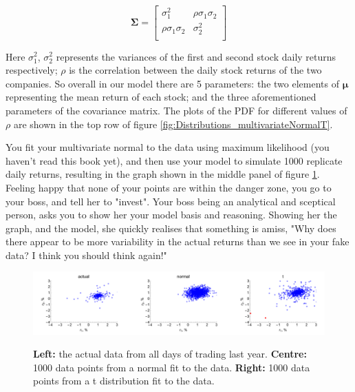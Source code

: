 \documentclass[11pt,fullpage]{book}
\begin{document}
\begin{equation}
\boldsymbol{\Sigma} = 
\begin{bmatrix}
\sigma_1^2 & \rho\sigma_1\sigma_2\\
\rho\sigma_1\sigma_2 & \sigma_2^2\\
\end{bmatrix}
\end{equation}

Here $\sigma_1^2$, $\sigma_2^2$ represents the variances of the first and second stock daily returns respectively; $\rho$ is the correlation between the daily stock returns of the two companies. So overall in our model there are 5 parameters: the two elements of $\boldsymbol{\mu}$ representing the mean return of each stock; and the three aforementioned parameters of the covariance matrix. The plots of the PDF for different values of $\rho$ are shown in the top row of figure \ref{fig:Distributions_multivariateNormalT}.

You fit your multivariate normal to the data using maximum likelihood (you haven't read this book yet), and then use your model to simulate 1000 replicate daily returns, resulting in the graph shown in the middle panel of figure \ref{fig:Distributions_multivariateNormalTEstimates}. Feeling happy that none of your points are within the danger zone, you go to your boss, and tell her to "invest". Your boss being an analytical and sceptical person, asks you to show her your model basis and reasoning. Showing her the graph, and the model, she quickly realises that something is amiss, "Why does there appear to be more variability in the actual returns than we see in your fake data? I think you should think again!"

\begin{figure}
\centering
\scalebox{0.3} 
{\includegraphics{Distributions_multivariateNormalTEstimates.pdf}}
\caption{\textbf{Left:} the actual data from all days of trading last year. \textbf{Centre:} 1000 data points from a normal fit to the data. \textbf{Right:} 1000 data points from a t distribution fit to the data.}\label{fig:Distributions_multivariateNormalTEstimates}
\end{figure}
\end{document}
